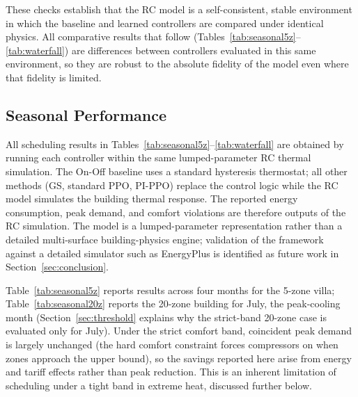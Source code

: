 \documentclass[12pt,a4paper]{article}
\begin{document}
These checks establish that the RC model is a self-consistent, stable environment in which the baseline and learned controllers are compared under identical physics. All comparative results that follow (Tables~\ref{tab:seasonal5z}--\ref{tab:waterfall}) are differences between controllers evaluated in this same environment, so they are robust to the absolute fidelity of the model even where that fidelity is limited.

\subsection{Seasonal Performance}

All scheduling results in Tables~\ref{tab:seasonal5z}--\ref{tab:waterfall} are obtained by running each controller within the same lumped-parameter RC thermal simulation. The On-Off baseline uses a standard hysteresis thermostat; all other methods (GS, standard PPO, PI-PPO) replace the control logic while the RC model simulates the building thermal response. The reported energy consumption, peak demand, and comfort violations are therefore outputs of the RC simulation. The model is a lumped-parameter representation rather than a detailed multi-surface building-physics engine; validation of the framework against a detailed simulator such as EnergyPlus is identified as future work in Section~\ref{sec:conclusion}.

Table~\ref{tab:seasonal5z} reports results across four months for the 5-zone villa; Table~\ref{tab:seasonal20z} reports the 20-zone building for July, the peak-cooling month (Section~\ref{sec:threshold} explains why the strict-band 20-zone case is evaluated only for July). Under the strict comfort band, coincident peak demand is largely unchanged (the hard comfort constraint forces compressors on when zones approach the upper bound), so the savings reported here arise from energy and tariff effects rather than peak reduction. This is an inherent limitation of scheduling under a tight band in extreme heat, discussed further below.
\end{document}
